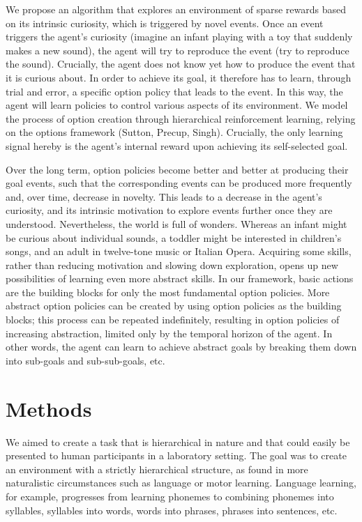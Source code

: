 \documentclass{article}
\begin{document}
We propose an algorithm that explores an environment of sparse rewards based on its intrinsic curiosity, which is triggered by novel events. Once an event triggers the agent's curiosity (imagine an infant playing with a toy that suddenly makes a new sound), the agent will try to reproduce the event (try to reproduce the sound). Crucially, the agent does not know yet how to produce the event that it is curious about. In order to achieve its goal, it therefore has to learn, through trial and error, a specific option policy that leads to the event. In this way, the agent will learn policies to control various aspects of its environment. We model the process of option creation through hierarchical reinforcement learning, relying on the options framework (Sutton, Precup, Singh). Crucially, the only learning signal hereby is the agent's internal reward upon achieving its self-selected goal.

Over the long term, option policies become better and better at producing their goal events, such that the corresponding events can be produced more frequently and, over time, decrease in novelty. This leads to a decrease in the agent's curiosity, and its intrinsic motivation to explore events further once they are understood. Nevertheless, the world is full of wonders. Whereas an infant might be curious about individual sounds, a toddler might be interested in children's songs, and an adult in twelve-tone music or Italian Opera. Acquiring some skills, rather than reducing motivation and slowing down exploration, opens up new possibilities of learning even more abstract skills. In our framework, basic actions are the building blocks for only the most fundamental option policies. More abstract option policies can be created by using option policies as the building blocks; this process can be repeated indefinitely, resulting in option policies of increasing abstraction, limited only by the temporal horizon of the agent. In other words, the agent can learn to achieve abstract goals by breaking them down into sub-goals and sub-sub-goals, etc.


\section{Methods}

We aimed to create a task that is hierarchical in nature and that could easily be presented to human participants in a laboratory setting. The goal was to create an environment with a strictly hierarchical structure, as found in more naturalistic circumstances such as language or motor learning. Language learning, for example, progresses from learning phonemes to combining phonemes into syllables, syllables into words, words into phrases, phrases into sentences, etc.
\end{document}

